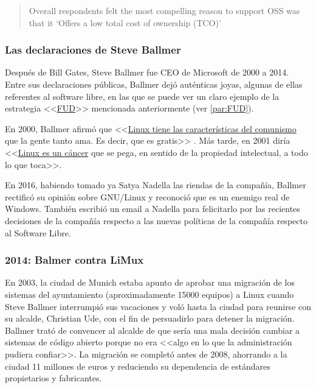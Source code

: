 \begin{quote}
    Overall respondents felt the most compelling reason to support OSS was that it `Offers a low total cost of ownership (TCO)'
\end{quote}

\subsubsection{Las declaraciones de Steve Ballmer}
Después de Bill Gates, Steve Ballmer fue CEO de Microsoft de 2000 a 2014. Entre sus declaraciones públicas, Ballmer dejó auténticas joyas, algunas de ellas referentes al software libre, en las que se puede ver un claro ejemplo de la estrategia <<\href{https://en.wikipedia.org/wiki/Fear,_uncertainty,_and_doubt}{FUD}>> mencionada anteriormente (ver \ref{par:FUD}).

En 2000, Ballmer afirmó que <<\href{https://www.theregister.co.uk/2000/07/31/ms_ballmer_linux_is_communism/}{Linux tiene las características del comunismo} que la gente tanto ama. Es decir, que es gratis>> \cite{lea_2000:ballmer_linux_comunism}. Más tarde, en 2001 diría <<\href{https://www.theregister.co.uk/2001/06/02/ballmer_linux_is_a_cancer/}{Linux es un cáncer} que se pega, en sentido de la propiedad intelectual, a todo lo que toca>>. \cite{greene_2018:ballmer_linux_cancer}

En 2016, habiendo tomado ya Satya Nadella las riendas de la compañía, Ballmer rectificó su opinión sobre GNU/Linux y reconoció que es un enemigo real de Windows. También escribió un email a Nadella para felicitarlo por las recientes decisiones de la compañía respecto a las nuevas políticas de la compañía respecto al Software Libre.\cite{tung_2016:ballmer_linux_no_more_cancer}

\subsubsection{2014: Balmer contra LiMux}
En 2003, la ciudad de Munich estaba apunto de aprobar una migración de los sistemas del ayuntamiento (aproximadamente 15000 equipos) a Linux cuando Steve Ballmer interrumpió sus vacaciones y voló hasta la ciudad para reunirse con su alcalde, Christian Ude, con el fin de persuadirlo para detener la migración. Ballmer trató de convencer al alcalde de que sería una mala decisión cambiar a sistemas de código abierto porque no era <<algo en lo que la administración pudiera confiar>>. La migración se completó antes de 2008, ahorrando a la ciudad 11 millones de euros y reduciendo su dependencia de estándares propietarios y fabricantes.\cite{munich_linux_migration}

